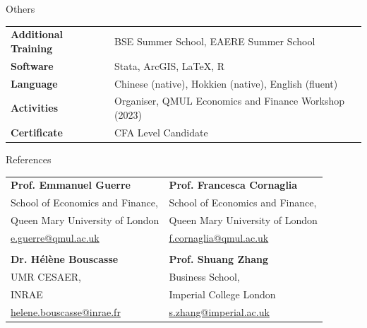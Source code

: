 \documentclass{resume} %
\begin{document}
	\vspace{2pt}

	
	\begin{rSection}{Others}
		\begin{tabular}{@{}>{\bfseries}l@{\hspace{6ex}}l}
			Additional Training & BSE Summer School, EAERE Summer School \\
			Software & Stata, ArcGIS, \LaTeX, R \\
			Language & Chinese (native), Hokkien (native), English (fluent) \\
			Activities & Organiser, QMUL Economics and Finance Workshop (2023) \\
			Certificate & CFA Level \uppercase\expandafter{\romannumeral3} Candidate
		\end{tabular}
	\end{rSection}
	
	\vspace{2pt}
	

\begin{rSection}{References}
	
	\begin{tabular}{@{}p{} p{}@{}}
		\textbf{Prof. Emmanuel Guerre} & \textbf{Prof. Francesca Cornaglia} \\
		School of Economics and Finance, & School of Economics and Finance, \\
		Queen Mary University of London & Queen Mary University of London \\
		\href{mailto:e.guerre@qmul.ac.uk}{e.guerre@qmul.ac.uk} & \href{mailto:f.cornaglia@qmul.ac.uk}{f.cornaglia@qmul.ac.uk} \\
		\\
		\textbf{Dr. Hélène Bouscasse} & \textbf{Prof. Shuang Zhang} \\
		UMR CESAER, & Business School, \\
		INRAE & Imperial College London \\
		\href{mailto:helene.bouscasse@inrae.fr}{helene.bouscasse@inrae.fr} & \href{mailto:s.zhang@imperial.ac.uk}{s.zhang@imperial.ac.uk} \\
	\end{tabular}
	
\end{rSection}

	
	
\end{document}
